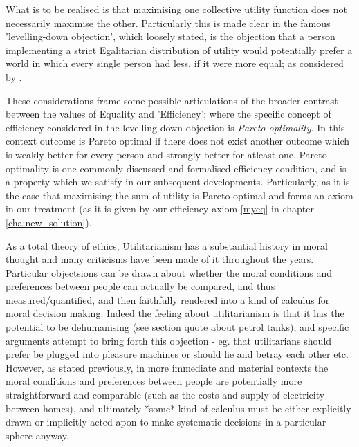 What is to be realised is that maximising one collective utility function does not necessarily maximise the other.
Particularly this is made clear in the famous 'levelling-down objection', which loosely stated, is the objection that a person implementing a strict Egalitarian distribution of utility would potentially prefer a world in which every single person had less, if it were more equal; as considered by \cite{equalityandpriorityparfit, temkin_2003}.

These considerations frame some possible articulations of the broader contrast between the values of Equality and 'Efficiency'; where the specific concept of efficiency considered in the levelling-down objection is \textit{Pareto optimality}.
In this context outcome is Pareto optimal if there does not exist another outcome which is weakly better for every person and strongly better for atleast one.
Pareto optimality is one commonly discussed and formalised efficiency condition, and is a property which we satisfy in our subsequent developments.
Particularly, as it is the case that maximising the sum of utility is Pareto optimal and forms an axiom in our treatment (as it is given by our efficiency axiom \eqref{myeq} in chapter \ref{cha:new_solution}).

As a total theory of ethics, Utilitarianism has a substantial history in moral thought and many criticisms have been made of it throughout the years. Particular objectsions can be drawn about whether the moral conditions and preferences between people can actually be compared, and thus measured/quantified, and then faithfully rendered into a kind of calculus for moral decision making. Indeed the feeling about utilitarianism is that it has the potential to be dehumanising (see section quote about petrol tanks), and specific arguments attempt to bring forth this objection - eg. that utilitarians should prefer be plugged into pleasure machines \cite{GVK021647801} or should lie and betray each other \cite{kymlicka2002contemporary} etc.
However, as stated previously, in more immediate and material contexts the moral conditions and preferences between people are potentially more straightforward and comparable (such as the costs and supply of electricity between homes), and ultimately *some* kind of calculus must be either explicitly drawn or implicitly acted apon to make systematic decisions in a particular sphere anyway.

